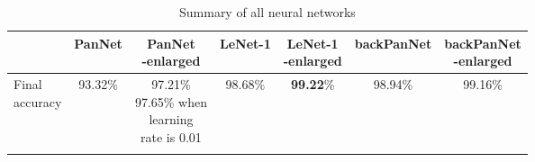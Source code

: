 \begin{table}
\centering
\caption{Summary of all neural networks}\label{tab:summary_acc}
\begin{tabular}{l c c c c c c}
\toprule
& PanNet & \makecell{PanNet\\-enlarged}& LeNet-1 & \makecell{LeNet-1\\-enlarged}  & backPanNet & \makecell{backPanNet\\-enlarged}\\
\midrule
\makecell{Final \\ accuracy} & 93.32\% & \makecell{97.21\% \\ 97.65\% when \\ learning \\ rate is 0.01} & 98.68\% & \textbf{99.22}\% & 98.94\% & 99.16\%\\ 
\bottomrule\\
\end{tabular}
\end{table}
